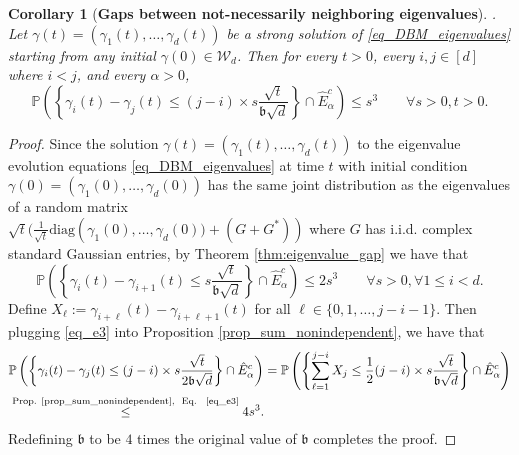 \documentclass[11pt,letterpaper]{article}
\newtheorem{corollary}[theorem]{Corollary}
\begin{document}
\noindent
%
%
\begin{corollary}[\bf Gaps between not-necessarily neighboring  eigenvalues]\label{lemma_gaps_any_start}
\qquad  \qquad \qquad  \qquad \qquad \qquad \qquad . 
 Let $\gamma(t) = (\gamma_1(t), \ldots, \gamma_d(t))$ be a strong solution  of \eqref{eq_DBM_eigenvalues} starting from any initial $\gamma(0) \in \mathcal{W}_d$.
%
Then for every $t>0$, every $i,j \in [d]$ where $i<j$, and every $\alpha>0$,
%
\begin{equation*}
    \mathbb{P}\left(\left\{ \gamma_i(t) - \gamma_{j}(t) \leq (j-i) \times s \frac{\sqrt{t}}{\mathfrak{b}\sqrt{d}} \right\} \cap \hat{E}_\alpha^c\right) \leq  s^3 \qquad \forall s>0, t>0.
\end{equation*}
%
%
\end{corollary}

\begin{proof}


Since the solution $\gamma(t) = (\gamma_1(t), \ldots, \gamma_d(t))$ to the eigenvalue evolution equations \eqref{eq_DBM_eigenvalues} at time $t$ with initial condition $\gamma(0) = (\gamma_1(0), \ldots, \gamma_d(0))$ has the same joint distribution as the eigenvalues of a random matrix\\ $\sqrt{t}(\frac{1}{\sqrt{t}}\mathrm{diag}\left(\gamma_1(0), \ldots, \gamma_d(0)) + (G+G^\ast)\right)$ where $G$ has i.i.d. complex standard Gaussian entries, by Theorem \ref{thm:eigenvalue_gap} we have that
%
\begin{equation}\label{eq_e3}
    \mathbb{P}\left(\left \{\gamma_i(t) - \gamma_{i+1}(t) \leq s \frac{\sqrt{t}}{\mathfrak{b}\sqrt{d}}\right\} \cap \hat{E}_\alpha^c\right) \leq 2s^{3} \qquad \forall s>0, \forall 1\leq i < d.
\end{equation}
%
Define $X_\ell := \gamma_{i+\ell}(t) - \gamma_{i+\ell+1}(t) $ for all $\ell \in \{0,1, \ldots, j-i-1\}$.
%
%
Then plugging \eqref{eq_e3} into Proposition \ref{prop_sum_nonindependent}, we have that
%
\begin{eqnarray*}
   &\mathbb{P}\left(\left\{ \gamma_i(t) - \gamma_{j}(t) \leq (j-i) \times s \frac{\sqrt{t}}{2\mathfrak{b}\sqrt{d}} \right \} \cap\hat{E}_\alpha^c\right)\nonumber
   =\mathbb{P}\left(\left\{ \sum_{\ell=1}^{j-i} X_j \leq \frac{1}{2}(j-i) \times s \frac{\sqrt{t}}{\mathfrak{b}\sqrt{d}} \right \} \cap \hat{E}_\alpha^c \right)\\
    & \stackrel{\textrm{Prop.  \ref{prop_sum_nonindependent}, \textrm{ Eq. } \eqref{eq_e3}}}{\leq}  4 s^{3}.
\end{eqnarray*}
%
%
Redefining $\mathfrak{b}$ to be $4$ times the original value of $\mathfrak{b}$ completes the proof.
\end{proof}
%
\end{document}
